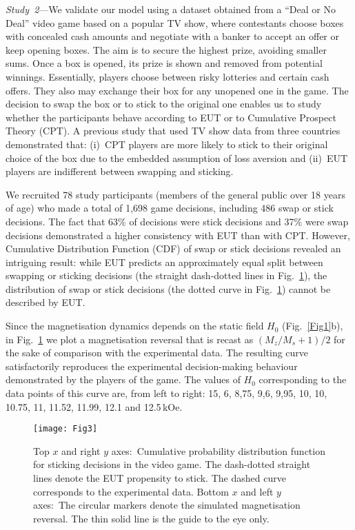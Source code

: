 \documentclass[aps,prl,reprint,superscriptaddress]{revtex4-2}
\begin{document}
{\it Study~2}---We validate our model using a dataset obtained from a ``Deal or No Deal'' video game based on a popular TV show, where contestants choose boxes with concealed cash amounts and negotiate with a banker to accept an offer or keep opening boxes. The aim is to secure the highest prize, avoiding smaller sums. Once a box is opened, its prize is shown and removed from potential winnings. Essentially, players choose between risky lotteries and certain cash offers. They also may exchange their box for any unopened one in the game. The decision to swap the box or to stick to the original one enables us to study whether the participants behave according to EUT or to Cumulative Prospect Theory (CPT). A previous study \cite{blavatskyy2010endowment} that used TV show data from three countries demonstrated that: (i)~CPT players are more likely to stick to their original choice of the box due to the embedded assumption of loss aversion and (ii)~EUT players are indifferent between swapping and sticking.

We recruited 78 study participants (members of the general public over 18 years of age) who made a total of 1,698 game decisions, including 486 swap or stick decisions. The fact that 63\% of decisions were stick decisions and 37\% were swap decisions demonstrated a higher consistency with EUT than with CPT. However, Cumulative Distribution Function (CDF) of swap or stick decisions revealed an intriguing result: while EUT predicts an approximately equal split between swapping or sticking decisions (the straight dash-dotted lines in Fig.~\ref{Fig3}), the distribution of swap or stick decisions (the dotted curve in Fig.~\ref{Fig3}) cannot be described by EUT.

Since the magnetisation dynamics depends on the static field $H_0$ (Fig.~\ref{Fig1}b), in Fig.~\ref{Fig3} we plot a magnetisation reversal that is recast as $(M_z/M_s+1)/2$ for the sake of comparison with the experimental data. The resulting curve satisfactorily reproduces the experimental decision-making behaviour demonstrated by the players of the game. The values of $H_0$ corresponding to the data points of this curve are, from left to right: 15, 6, 8,75, 9,6, 9,95, 10, 10, 10.75, 11, 11.52, 11.99, 12.1 and 12.5\,kOe.
\begin{figure}
 \texttt{[image: Fig3]}
 \caption{Top $x$ and right $y$ axes:~Cumulative probability distribution function for sticking decisions in the video game. The dash-dotted straight lines denote the EUT propensity to stick. The dashed curve corresponds to the experimental data. Bottom $x$ and left $y$ axes:~The circular markers denote the simulated magnetisation reversal. The thin solid line is the guide to the eye only.\label{Fig3}}
\end{figure}
\end{document}
